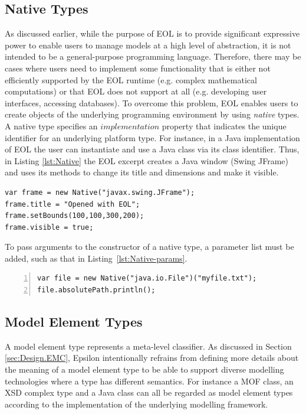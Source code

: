 \subsection{Native Types}

As discussed earlier, while the purpose of EOL is to provide significant expressive power to enable users to manage models at a high level of abstraction, it is not intended to be a general-purpose programming language. Therefore, there may be cases where users need to implement some functionality that is either not efficiently supported by the EOL runtime (e.g. complex mathematical computations) or that EOL does not support at all (e.g. developing user interfaces, accessing databases). To overcome this problem, EOL enables users to create objects of the underlying programming environment by using \emph{native} types. A native type specifies an $implementation$ property that indicates the unique identifier for an underlying platform type. For instance, in a Java implementation of EOL the user can instantiate and use a Java class via its class identifier. Thus, in Listing \ref{lst:Native} the EOL excerpt creates a Java window (Swing JFrame) and uses its methods to change its title and dimensions and make it visible.

\begin{lstlisting}[float=tbp, caption=Demonstration of NativeType in EOL, label=lst:Native, language=EOL]
var frame = new Native("javax.swing.JFrame");
frame.title = "Opened with EOL";
frame.setBounds(100,100,300,200);
frame.visible = true;
\end{lstlisting}

To pass arguments to the constructor of a native type, a parameter list must be added, such as that in Listing~\ref{lst:Native-params}.

\begin{lstlisting}[float=tbp, caption=Demonstration of NativeType in EOL, label=lst:Native-params, numbers=left, language=EOL]
var file = new Native("java.io.File")("myfile.txt");
file.absolutePath.println();
\end{lstlisting}

\subsection{Model Element Types}

A model element type represents a meta-level classifier. As discussed in Section \ref{sec:Design.EMC}, Epsilon intentionally refrains from defining more details about the meaning of a model element type to be able to support diverse modelling technologies where a type has different semantics. For instance a MOF class, an XSD complex type and a Java class can all be regarded as model element types according to the implementation of the underlying modelling framework.

